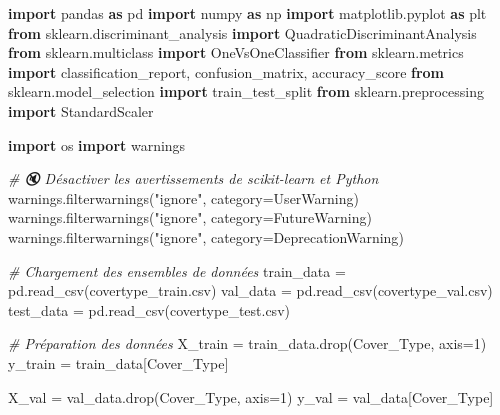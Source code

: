 \documentclass[
  letterpaper,
  DIV=11,
  numbers=noendperiod]{scrartcl}
\newenvironment{Shaded}{}{}
\newcommand{\CommentTok}[1]{\textcolor[rgb]{0.38,0.63,0.69}{\textit{#1}}}
\newcommand{\DecValTok}[1]{\textcolor[rgb]{0.25,0.63,0.44}{#1}}
\newcommand{\ImportTok}[1]{\textcolor[rgb]{0.00,0.50,0.00}{\textbf{#1}}}
\newcommand{\NormalTok}[1]{#1}
\newcommand{\OperatorTok}[1]{\textcolor[rgb]{0.40,0.40,0.40}{#1}}
\newcommand{\PreprocessorTok}[1]{\textcolor[rgb]{0.74,0.48,0.00}{#1}}
\newcommand{\StringTok}[1]{\textcolor[rgb]{0.25,0.44,0.63}{#1}}
\begin{document}
\begin{Shaded}
\begin{Highlighting}[]
\ImportTok{import}\NormalTok{ pandas }\ImportTok{as}\NormalTok{ pd}
\ImportTok{import}\NormalTok{ numpy }\ImportTok{as}\NormalTok{ np}
\ImportTok{import}\NormalTok{ matplotlib.pyplot }\ImportTok{as}\NormalTok{ plt}
\ImportTok{from}\NormalTok{ sklearn.discriminant\_analysis }\ImportTok{import}\NormalTok{ QuadraticDiscriminantAnalysis}
\ImportTok{from}\NormalTok{ sklearn.multiclass }\ImportTok{import}\NormalTok{ OneVsOneClassifier}
\ImportTok{from}\NormalTok{ sklearn.metrics }\ImportTok{import}\NormalTok{ classification\_report, confusion\_matrix, accuracy\_score}
\ImportTok{from}\NormalTok{ sklearn.model\_selection }\ImportTok{import}\NormalTok{ train\_test\_split}
\ImportTok{from}\NormalTok{ sklearn.preprocessing }\ImportTok{import}\NormalTok{ StandardScaler}

\ImportTok{import}\NormalTok{ os}
\ImportTok{import}\NormalTok{ warnings}

\CommentTok{\# 🔇 Désactiver les avertissements de scikit{-}learn et Python}
\NormalTok{warnings.filterwarnings(}\StringTok{"ignore"}\NormalTok{, category}\OperatorTok{=}\PreprocessorTok{UserWarning}\NormalTok{)}
\NormalTok{warnings.filterwarnings(}\StringTok{"ignore"}\NormalTok{, category}\OperatorTok{=}\PreprocessorTok{FutureWarning}\NormalTok{)}
\NormalTok{warnings.filterwarnings(}\StringTok{"ignore"}\NormalTok{, category}\OperatorTok{=}\PreprocessorTok{DeprecationWarning}\NormalTok{)}


\CommentTok{\# Chargement des ensembles de données}
\NormalTok{train\_data }\OperatorTok{=}\NormalTok{ pd.read\_csv(}\StringTok{\textquotesingle{}covertype\_train.csv\textquotesingle{}}\NormalTok{)}
\NormalTok{val\_data }\OperatorTok{=}\NormalTok{ pd.read\_csv(}\StringTok{\textquotesingle{}covertype\_val.csv\textquotesingle{}}\NormalTok{)}
\NormalTok{test\_data }\OperatorTok{=}\NormalTok{ pd.read\_csv(}\StringTok{\textquotesingle{}covertype\_test.csv\textquotesingle{}}\NormalTok{)}

\CommentTok{\# Préparation des données}
\NormalTok{X\_train }\OperatorTok{=}\NormalTok{ train\_data.drop(}\StringTok{\textquotesingle{}Cover\_Type\textquotesingle{}}\NormalTok{, axis}\OperatorTok{=}\DecValTok{1}\NormalTok{)}
\NormalTok{y\_train }\OperatorTok{=}\NormalTok{ train\_data[}\StringTok{\textquotesingle{}Cover\_Type\textquotesingle{}}\NormalTok{]}

\NormalTok{X\_val }\OperatorTok{=}\NormalTok{ val\_data.drop(}\StringTok{\textquotesingle{}Cover\_Type\textquotesingle{}}\NormalTok{, axis}\OperatorTok{=}\DecValTok{1}\NormalTok{)}
\NormalTok{y\_val }\OperatorTok{=}\NormalTok{ val\_data[}\StringTok{\textquotesingle{}Cover\_Type\textquotesingle{}}\NormalTok{]}


\end{Highlighting}
\end{Shaded}
\end{document}
